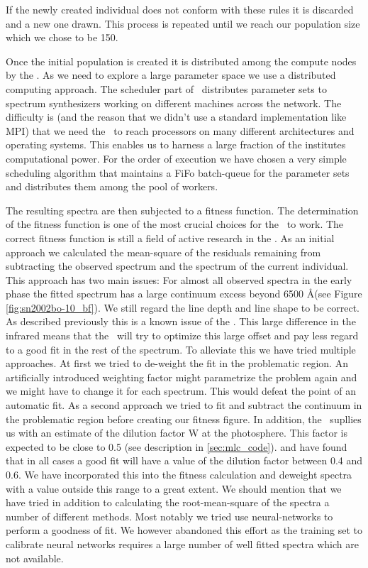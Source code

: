 If the newly created individual does not conform with these rules it is discarded and a new one drawn. This process is repeated until we reach our population size which we chose to be 150.

Once the initial population is created it is distributed among the compute nodes by the \dalek. As we need to explore a large parameter space we use a distributed computing approach. The scheduler part of \dalek\ distributes parameter sets to spectrum synthesizers working on different machines across the network. The difficulty is (and the reason that we didn't use a standard implementation like MPI) that we need the \dalek\ to reach processors on many different architectures and operating systems. This enables us to harness a large fraction of the institutes computational power. For the order of execution we have chosen a very simple scheduling algorithm that maintains a FiFo batch-queue for the parameter sets and distributes them among the pool of workers.

The resulting spectra are then subjected to a fitness function. The determination of the fitness function is one of the most crucial  choices for the \ga\ to work. The correct fitness function is still a field of active research in the \dalek. As an initial approach we calculated the mean-square of the residuals remaining from subtracting the observed spectrum and the spectrum of the current individual. This approach has two main issues: For almost all observed spectra in the early phase the fitted spectrum has a large continuum excess beyond 6500 \AA (see Figure \ref{fig:sn2002bo-10_bf}). We still regard the line depth and line shape to be correct. As described previously this is a known issue of the \mlc. This large difference in the infrared means that the \dalek\ will try to optimize this large offset and pay less regard to a good fit in the rest of the spectrum. To alleviate this we have tried multiple approaches. At first we tried to de-weight the fit in the problematic region. An artificially introduced weighting factor might parametrize the problem again and we might have to change it for each spectrum. This would defeat the point of an automatic fit. As a second approach we tried to fit and subtract the continuum in the problematic region before creating our fitness figure. 
In addition, the \mlc\ supllies us with an estimate of the dilution factor W at the photosphere. This factor is expected to be close to 0.5 (see description in \ref{sec:mlc_code}). \citet{hachinger_dipl2007} and \citep{hachinger_phd2011} have found that in all cases a good fit will have a value of the dilution factor between 0.4 and 0.6. We have incorporated this into the fitness calculation and deweight spectra with a value outside this range to a great extent.
We should mention that we have tried in addition to calculating the root-mean-square of the spectra a number of different methods. Most notably we tried use neural-networks to perform a goodness of fit. We however abandoned this effort as the training set to calibrate neural networks requires a large number of well fitted spectra which are not available. 

